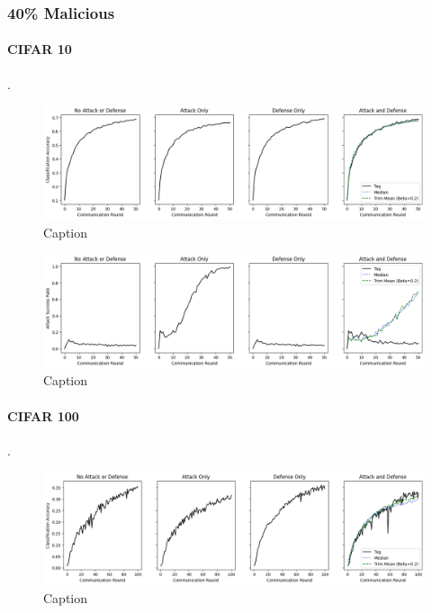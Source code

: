 \documentclass{article} %
\begin{document}
%
\pagebreak
\subsubsection{40\% Malicious}


%
\paragraph{CIFAR 10}.

\begin{figure}[H]
    \centering
    \includegraphics[width=\textwidth]{cifar_10/neuro/tag/distributed/alpha10000--alpha_val10000/visuals/clean_accuracy--n_malicious4--beta0.2.png}
    \caption{Caption}
    \label{fig:my_label}
\end{figure}

\begin{figure}[H]
    \centering
    \includegraphics[width=\textwidth]{cifar_10/neuro/tag/distributed/alpha10000--alpha_val10000/visuals/pois_accuracy--n_malicious4--beta0.2.png}
    \caption{Caption}
    \label{fig:my_label}
\end{figure}


%
\paragraph{CIFAR 100}.

\begin{figure}[H]
    \centering
    \includegraphics[width=\textwidth]{cifar_100/neuro/tag/distributed/alpha10000--alpha_val10000/visuals/clean_accuracy--n_malicious4--beta0.2.png}
    \caption{Caption}
    \label{fig:my_label}
\end{figure}
\end{document}
